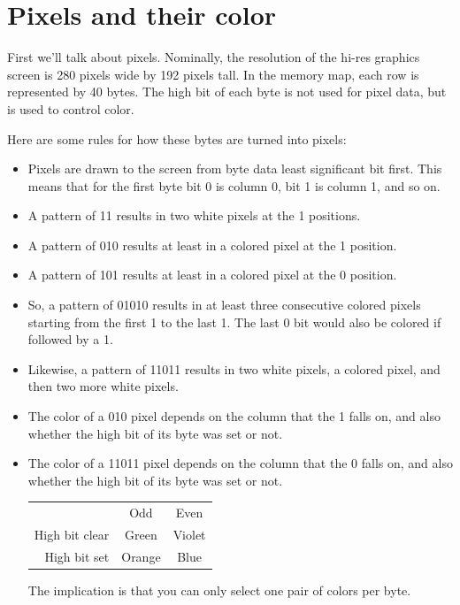 \documentclass[10pt]{report}%
\begin{document}
\section{Pixels and their color}
First we'll talk about pixels. Nominally, the resolution of the hi-res graphics screen
is 280 pixels wide by 192 pixels tall. In the memory map, each row is represented
by 40 bytes. The high bit of each byte is not used for pixel data, but is used to
control color.

Here are some rules for how these bytes are turned into pixels:
\begin{itemize}
  \item Pixels are drawn to the screen from byte data least significant bit first.
        This means that for the first byte bit 0 is column 0, bit 1 is column 1,
        and so on.
  \item A pattern of {\Tt{}11\nwendquote} results in two white pixels at the {\Tt{}1\nwendquote} positions.
  \item A pattern of {\Tt{}010\nwendquote} results at least in a colored pixel at the {\Tt{}1\nwendquote} position.
  \item A pattern of {\Tt{}101\nwendquote} results at least in a colored pixel at the {\Tt{}0\nwendquote} position.
  \item So, a pattern of {\Tt{}01010\nwendquote} results in at least three consecutive colored
        pixels starting from the first {\Tt{}1\nwendquote} to the last {\Tt{}1\nwendquote}. The last {\Tt{}0\nwendquote} bit
        would also be colored if followed by a {\Tt{}1\nwendquote}.
  \item Likewise, a pattern of {\Tt{}11011\nwendquote} results in two white pixels, a colored pixel,
        and then two more white pixels.
  \item The color of a {\Tt{}010\nwendquote} pixel depends on the column that the {\Tt{}1\nwendquote} falls on, and
        also whether the high bit of its byte was set or not. 
  \item The color of a {\Tt{}11011\nwendquote} pixel depends on the column that the {\Tt{}0\nwendquote} falls on, and
        also whether the high bit of its byte was set or not.

        \begin{center}
        \begin{tabular}{@{}rcc@{}} \toprule
        & Odd & Even \\ \cmidrule(r){2-3}
        High bit clear & Green & Violet \\
        High bit set & Orange & Blue \\ \bottomrule
        \end{tabular}
        \end{center}

        The implication is that you can only select one pair of colors per byte.
\end{itemize}
\end{document}
